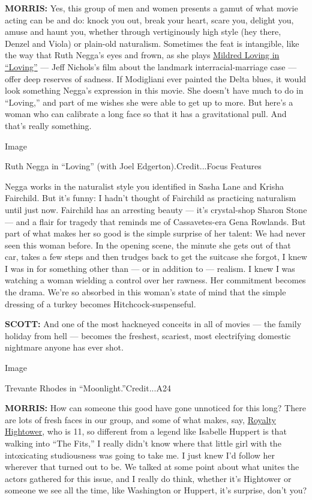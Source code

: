 \textbf{MORRIS:} Yes, this group of men and women presents a gamut of
what movie acting can be and do: knock you out, break your heart, scare
you, delight you, amuse and haunt you, whether through vertiginously
high style (hey there, Denzel and Viola) or plain-old naturalism.
Sometimes the feat is intangible, like the way that Ruth Negga's eyes
and frown, as she plays
\href{https://www.nytimes3xbfgragh.onion/2016/11/13/movies/loving-jeff-nichols-interview.html}{Mildred
Loving in ``Loving''} --- Jeff Nichols's film about the landmark
interracial-marriage case --- offer deep reserves of sadness. If
Modigliani ever painted the Delta blues, it would look something Negga's
expression in this movie. She doesn't have much to do in ``Loving,'' and
part of me wishes she were able to get up to more. But here's a woman
who can calibrate a long face so that it has a gravitational pull. And
that's really something.

Image

Ruth Negga in ``Loving'' (with Joel Edgerton).Credit...Focus Features

Negga works in the naturalist style you identified in Sasha Lane and
Krisha Fairchild. But it's funny: I hadn't thought of Fairchild as
practicing naturalism until just now. Fairchild has an arresting beauty
--- it's crystal-shop Sharon Stone --- and a flair for tragedy that
reminds me of Cassavetes-era Gena Rowlands. But part of what makes her
so good is the simple surprise of her talent: We had never seen this
woman before. In the opening scene, the minute she gets out of that car,
takes a few steps and then trudges back to get the suitcase she forgot,
I knew I was in for something other than --- or in addition to ---
realism. I knew I was watching a woman wielding a control over her
rawness. Her commitment becomes the drama. We're so absorbed in this
woman's state of mind that the simple dressing of a turkey becomes
Hitchcock-suspenseful.

\textbf{SCOTT:} And one of the most hackneyed conceits in all of movies
--- the family holiday from hell --- becomes the freshest, scariest,
most electrifying domestic nightmare anyone has ever shot.

Image

Trevante Rhodes in ``Moonlight.''Credit...A24

\textbf{MORRIS:} How can someone this good have gone unnoticed for this
long? There are lots of fresh faces in our group, and some of what
makes, say,
\href{https://www.nytimes3xbfgragh.onion/2016/01/30/movies/sundance-actors-ages-10-and-16-join-the-breakthrough-ranks.html}{Royalty
Hightower}, who is 11, so different from a legend like Isabelle Huppert
is that walking into ``The Fits,'' I really didn't know where that
little girl with the intoxicating studiousness was going to take me. I
just knew I'd follow her wherever that turned out to be. We talked at
some point about what unites the actors gathered for this issue, and I
really do think, whether it's Hightower or someone we see all the time,
like Washington or Huppert, it's surprise, don't you?

